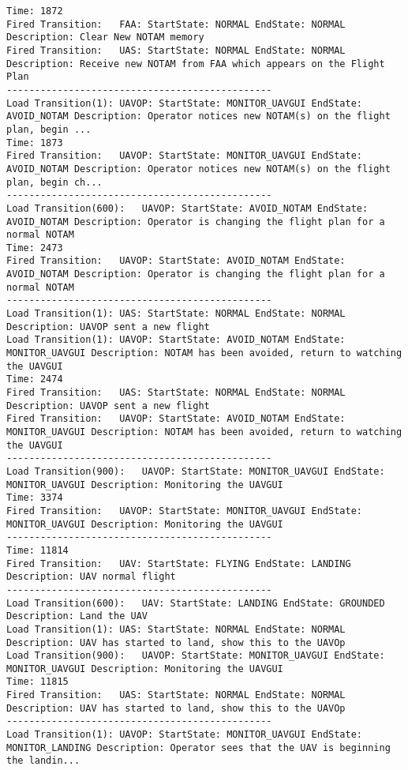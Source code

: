\begin{spacing}{1}
\begin{verbatim}
Time: 1872
Fired Transition:	FAA: StartState: NORMAL EndState: NORMAL Description: Clear New NOTAM memory
Fired Transition:	UAS: StartState: NORMAL EndState: NORMAL Description: Receive new NOTAM from FAA which appears on the Flight Plan
-----------------------------------------------
Load Transition(1):	UAVOP: StartState: MONITOR_UAVGUI EndState: AVOID_NOTAM Description: Operator notices new NOTAM(s) on the flight plan, begin ...
Time: 1873
Fired Transition:	UAVOP: StartState: MONITOR_UAVGUI EndState: AVOID_NOTAM Description: Operator notices new NOTAM(s) on the flight plan, begin ch...
-----------------------------------------------
Load Transition(600):	UAVOP: StartState: AVOID_NOTAM EndState: AVOID_NOTAM Description: Operator is changing the flight plan for a normal NOTAM
Time: 2473
Fired Transition:	UAVOP: StartState: AVOID_NOTAM EndState: AVOID_NOTAM Description: Operator is changing the flight plan for a normal NOTAM
-----------------------------------------------
Load Transition(1):	UAS: StartState: NORMAL EndState: NORMAL Description: UAVOP sent a new flight
Load Transition(1):	UAVOP: StartState: AVOID_NOTAM EndState: MONITOR_UAVGUI Description: NOTAM has been avoided, return to watching the UAVGUI
Time: 2474
Fired Transition:	UAS: StartState: NORMAL EndState: NORMAL Description: UAVOP sent a new flight
Fired Transition:	UAVOP: StartState: AVOID_NOTAM EndState: MONITOR_UAVGUI Description: NOTAM has been avoided, return to watching the UAVGUI
-----------------------------------------------
Load Transition(900):	UAVOP: StartState: MONITOR_UAVGUI EndState: MONITOR_UAVGUI Description: Monitoring the UAVGUI
Time: 3374
Fired Transition:	UAVOP: StartState: MONITOR_UAVGUI EndState: MONITOR_UAVGUI Description: Monitoring the UAVGUI
-----------------------------------------------
Time: 11814
Fired Transition:	UAV: StartState: FLYING EndState: LANDING Description: UAV normal flight
-----------------------------------------------
Load Transition(600):	UAV: StartState: LANDING EndState: GROUNDED Description: Land the UAV
Load Transition(1):	UAS: StartState: NORMAL EndState: NORMAL Description: UAV has started to land, show this to the UAVOp
Load Transition(900):	UAVOP: StartState: MONITOR_UAVGUI EndState: MONITOR_UAVGUI Description: Monitoring the UAVGUI
Time: 11815
Fired Transition:	UAS: StartState: NORMAL EndState: NORMAL Description: UAV has started to land, show this to the UAVOp
-----------------------------------------------
Load Transition(1):	UAVOP: StartState: MONITOR_UAVGUI EndState: MONITOR_LANDING Description: Operator sees that the UAV is beginning the landin...

\end{verbatim}
\end{spacing}
